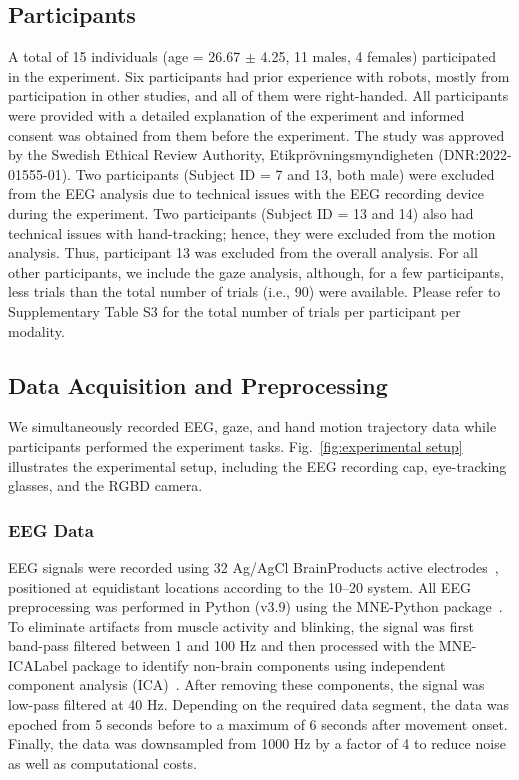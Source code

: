 \subsection*{Participants}
A total of 15 individuals (age = 26.67 \(\pm\) 4.25, 11 males, 4 females) participated in the experiment. Six participants had prior experience with robots, mostly from participation in other studies, and all of them were right-handed. All participants were provided with a detailed explanation of the experiment and informed consent was obtained from them before the experiment. The study was approved by the Swedish Ethical Review Authority, Etikprövningsmyndigheten (DNR:2022-01555-01).
Two participants (Subject ID = 7 and 13, both male) were excluded from the EEG analysis due to technical issues with the EEG recording device during the experiment. Two participants (Subject ID = 13 and 14) also had technical issues with hand-tracking; hence, they were excluded from the motion analysis. Thus, participant 13 was excluded from the overall analysis. For all other participants, we include the gaze analysis, although, for a few participants, less trials than the total number of trials (i.e., 90) were available. Please refer to Supplementary Table S3 for the total number of trials per participant per modality.

\subsection*{Data Acquisition and Preprocessing}

We simultaneously recorded EEG, gaze, and hand motion trajectory data while participants performed the experiment tasks. Fig.~\ref{fig:experimental setup} illustrates the experimental setup, including the EEG recording cap, eye-tracking glasses, and the RGBD camera. 

\subsubsection*{EEG Data}

EEG signals were recorded using 32 Ag/AgCl BrainProducts active electrodes~\cite{brainproductsBrainProducts}, positioned at equidistant locations according to the 10–20 system. All EEG preprocessing was performed in Python (v3.9) using the MNE-Python package~\cite{gramfort2013meg}. To eliminate artifacts from muscle activity and blinking, the signal was first band-pass filtered between 1 and 100 Hz and then processed with the MNE-ICALabel package to identify non-brain components using independent component analysis (ICA)~\cite{makeig1995independent,iriarte2003independent}. After removing these components, the signal was low-pass filtered at 40 Hz. Depending on the required data segment, the data was epoched from 5 seconds before to a maximum of 6 seconds after movement onset. Finally, the data was downsampled from 1000 Hz by a factor of 4 to reduce noise as well as computational costs. 

